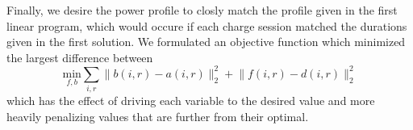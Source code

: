 \par Finally, we desire the power profile to closly match the profile given in the first linear program, which would occure if each charge session matched the durations given in the first solution. We formulated an objective function which minimized the largest difference between 
\begin{equation*}
	\underset{f,b}{\text{min}} \sum_{i,r}\lVert b(i,r) - a(i,r)\rVert_2^2 + \lVert f(i,r) - d(i,r) \rVert_2^2
\end{equation*}
which has the effect of driving each variable to the desired value and more heavily penalizing values that are further from their optimal.
\begin{comment}
\par We desire to solve this second optimization method in a greedy fashion using a heuristic approach. Let $\mathcal{B}$ be the set of all charge sessions which are sorted according to their {\it latest} start time.  Begin by removing the first, or earliest, $n_{\text{charger}}$ sessions and placing them in separate queues for a charger. For the remainder of the charge sessions, we remove the next item from the list, determine which chargers are available to service this request by checking that the previous service can finish before the next will start, and then select the charger which yields the smallest amount of overlap in session availability.
\begin{algorithm}[!ht]
\DontPrintSemicolon
\KwIn{Sorted List of Charge Sessions}
\KwOut{Charge Schedule for Each Charger}
\For{i = 1:$n_{\text{charger}}$}
{
	charger[i].append(inputList.pop())
}
\While{inputList not empty}
{
	item = inputList.pop()\;
	\For{i = 1:$n_{\text{charger}}$}
	{
		bestOverlap = inf\;
		bestCharger = -1\;
		\If{charger $i$ is available}		
		{
			\If{overlap is less than bestOverlap}
			{
				bestOverlap = itemOverlap\;
				bestCharger = i\;
			}
		}
	}
	charger[bestCharger].append(item)\;
}
\caption{Pseudocode that illustrates how charge sessions are assigned}
\label{alg:chargeAssign}
\end{algorithm}
\end{comment}
